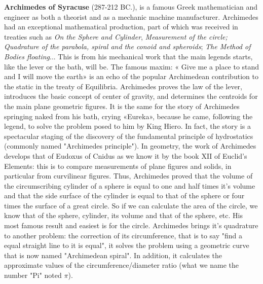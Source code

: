 \pichskip{15pt}%
\textbf{Archimedes of Syracuse }(287-212 BC.), is a famous Greek mathematician and engineer as both a theorist and as a mechanic machine manufacturer. Archimedes had an exceptional mathematical production, part of which was received in treaties such as \textit{On the Sphere and Cylinder}, \textit{Measurement of the circle; Quadrature of the parabola, spiral and the conoid and spheroids}; \textit{The Method of Bodies floating}... This is from his mechanical work that the main legends starts, like the lever or the bath, will be. The famous maxim: « Give me a place to stand and I will move the earth» is an echo of the popular Archimedean contribution to the static in the treaty of Equilibria. Archimedes proves the law of the lever, introduces the basic concept of center of gravity, and determines the centroids for the main plane geometric figures. It is the same for the story of Archimedes springing naked from his bath, crying  «Eureka», because he came, following the legend, to solve the problem posed to him by King Hiero. In fact, the story is a spectacular staging of the discovery of the fundamental principle of hydrostatics (commonly named "Archimedes principle"). In geometry, the work of Archimedes develops that of Eudoxus of Cnidus as we know it by the book XII of Euclid's Elements: this is to compare measurements of plane figures and solids, in particular from curvilinear figures. Thus, Archimedes proved that the volume of the circumscribing cylinder of a sphere is equal to one and half times it's volume and that the side surface of the cylinder is equal to that of the sphere or four times the surface of a great circle. So if we can calculate the area of the circle, we know that of the sphere, cylinder, its volume and that of the sphere, etc. His most famous result and easiest is for the circle. Archimedes brings it's quadrature to another problem: the correction of its circumference, that is to say "find a equal straight line to it is equal", it solves the problem using a geometric curve that is now named "Archimedean spiral". In addition, it calculates the approximate values of the circumference/diameter ratio (what we name the number "Pi" noted $\pi$).

